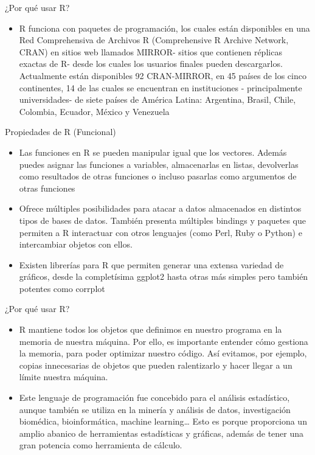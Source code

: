 \documentclass[ignorenonframetext,]{beamer}
\providecommand{\tightlist}{%
  \setlength{\itemsep}{0pt}\setlength{\parskip}{0pt}}
\begin{document}
\begin{frame}{¿Por qué usar R?}

\begin{itemize}
\tightlist
\item
  R funciona con paquetes de programación, los cuales están disponibles
  en una Red Comprehensiva de Archivos R (Comprehensive R Archive
  Network, CRAN) en sitios web llamados MIRROR- sitios que contienen
  réplicas exactas de R- desde los cuales los usuarios finales pueden
  descargarlos. Actualmente están disponibles 92 CRAN-MIRROR, en 45
  países de los cinco continentes, 14 de las cuales se encuentran en
  instituciones - principalmente universidades- de siete países de
  América Latina: Argentina, Brasil, Chile, Colombia, Ecuador, México y
  Venezuela
\end{itemize}

\end{frame}

\begin{frame}{Propiedades de R (Funcional)}

\begin{itemize}
\item
  Las funciones en R se pueden manipular igual que los vectores. Además
  puedes asignar las funciones a variables, almacenarlas en listas,
  devolverlas como resultados de otras funciones o incluso pasarlas como
  argumentos de otras funciones
\item
  Ofrece múltiples posibilidades para atacar a datos almacenados en
  distintos tipos de bases de datos. También presenta múltiples bindings
  y paquetes que permiten a R interactuar con otros lenguajes (como
  Perl, Ruby o Python) e intercambiar objetos con ellos.
\item
  Existen librerías para R que permiten generar una extensa variedad de
  gráficos, desde la completísima ggplot2 hasta otras más simples pero
  también potentes como corrplot
\end{itemize}

\end{frame}

\begin{frame}{¿Por qué usar R?}

\begin{itemize}
\item
  R mantiene todos los objetos que definimos en nuestro programa en la
  memoria de nuestra máquina. Por ello, es importante entender cómo
  gestiona la memoria, para poder optimizar nuestro código. Así
  evitamos, por ejemplo, copias innecesarias de objetos que pueden
  ralentizarlo y hacer llegar a un límite nuestra máquina.
\item
  Este lenguaje de programación fue concebido para el análisis
  estadístico, aunque también se utiliza en la minería y análisis de
  datos, investigación biomédica, bioinformática, machine
  learning\ldots{} Esto es porque proporciona un amplio abanico de
  herramientas estadísticas y gráficas, además de tener una gran
  potencia como herramienta de cálculo.
\end{itemize}

\end{frame}
\end{document}
